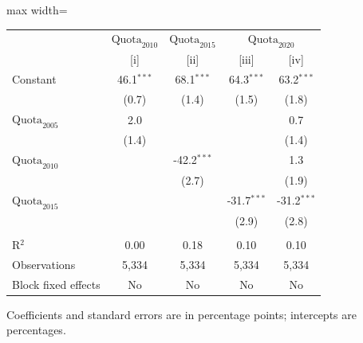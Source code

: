 
\begingroup
\centering
\scriptsize
\begin{adjustbox}{max width=\linewidth}
   \begin{threeparttable}[b]
      \begin{tabular}{lcccc}
         \toprule
          & \textit{$\text{Quota}_{2010}$} & \textit{$\text{Quota}_{2015}$} & \multicolumn{2}{c}{\textit{$\text{Quota}_{2020}$}}\\
                                & [i]          & [ii]          & [iii]         & [iv]\\
         \midrule
         Constant               & 46.1$^{***}$ & 68.1$^{***}$  & 64.3$^{***}$  & 63.2$^{***}$\\
                                & (0.7)        & (1.4)         & (1.5)         & (1.8)\\
         $\text{Quota}_{2005}$  & 2.0          &               &               & 0.7\\
                                & (1.4)        &               &               & (1.4)\\
         $\text{Quota}_{2010}$  &              & -42.2$^{***}$ &               & 1.3\\
                                &              & (2.7)         &               & (1.9)\\
         $\text{Quota}_{2015}$  &              &               & -31.7$^{***}$ & -31.2$^{***}$\\
                                &              &               & (2.9)         & (2.8)\\
          \\
         R$^2$                  & 0.00         & 0.18          & 0.10          & 0.10\\
         Observations           & 5,334        & 5,334         & 5,334         & 5,334\\
         Block fixed effects    & No           & No            & No            & No\\
         \bottomrule
      \end{tabular}

      \begin{tablenotes}
         \item  Coefficients and standard errors are in percentage points; intercepts are percentages.
      \end{tablenotes}
   \end{threeparttable}
\end{adjustbox}
\par\endgroup


